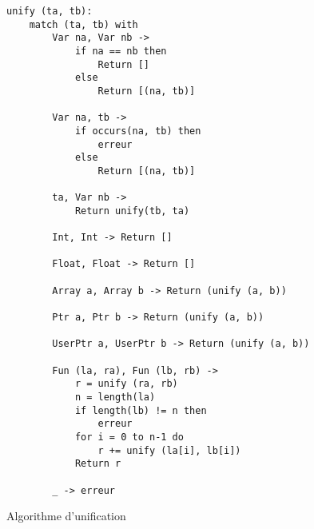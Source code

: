 \begin{figure}[h]%
\begin{Verbatim}
unify (ta, tb):
    match (ta, tb) with
        Var na, Var nb ->
            if na == nb then
                Return []
            else
                Return [(na, tb)]

        Var na, tb ->
            if occurs(na, tb) then
                erreur
            else
                Return [(na, tb)]

        ta, Var nb ->
            Return unify(tb, ta)

        Int, Int -> Return []

        Float, Float -> Return []

        Array a, Array b -> Return (unify (a, b))

        Ptr a, Ptr b -> Return (unify (a, b))

        UserPtr a, UserPtr b -> Return (unify (a, b))

        Fun (la, ra), Fun (lb, rb) ->
            r = unify (ra, rb)
            n = length(la)
            if length(lb) != n then
                erreur
            for i = 0 to n-1 do
                r += unify (la[i], lb[i])
            Return r

        _ -> erreur

\end{Verbatim}

\caption{Algorithme d'unification}
\label{fig:algo-unif}
\end{figure}%

